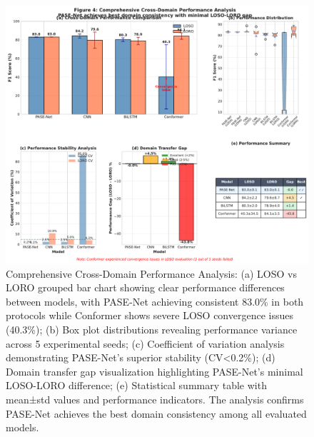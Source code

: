 \documentclass[lettersize,journal]{IEEEtran}
\begin{document}
\begin{figure}[t]
\centering
\includegraphics[width=\linewidth]{plots/fig4_cross_domain.pdf}
\caption{Comprehensive Cross-Domain Performance Analysis: (a) LOSO vs LORO grouped bar chart showing clear performance differences between models, with PASE-Net achieving consistent 83.0\% in both protocols while Conformer shows severe LOSO convergence issues (40.3\%); (b) Box plot distributions revealing performance variance across 5 experimental seeds; (c) Coefficient of variation analysis demonstrating PASE-Net's superior stability (CV<0.2\%); (d) Domain transfer gap visualization highlighting PASE-Net's minimal LOSO-LORO difference; (e) Statistical summary table with mean±std values and performance indicators. The analysis confirms PASE-Net achieves the best domain consistency among all evaluated models.}
\label{fig:cross_domain}
\end{figure}
\end{document}
